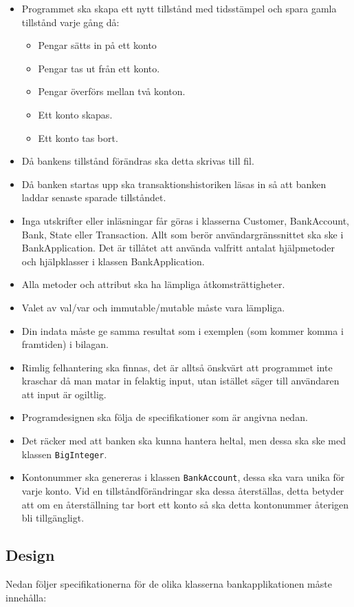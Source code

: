 \begin{itemize}
\item Programmet ska skapa ett nytt tillstånd med tidsstämpel och spara gamla tillstånd varje gång då:
\begin{itemize}
\item Pengar sätts in på ett konto
\item Pengar tas ut från ett konto.
\item Pengar överförs mellan två konton.
\item Ett konto skapas.
\item Ett konto tas bort.
\end{itemize}
\item Då bankens tillstånd förändras ska detta skrivas till fil.
\item Då banken startas upp ska transaktionshistoriken läsas in så att banken laddar senaste sparade tillståndet.
\item Inga utskrifter eller inläsningar får göras i klasserna Customer, BankAccount, Bank, State eller Transaction. Allt som berör användargränssnittet ska ske i BankApplication. Det är tillåtet att använda valfritt antalat hjälpmetoder och hjälpklasser i klassen BankApplication.
\item Alla metoder och attribut ska ha lämpliga åtkomsträttigheter.
\item Valet av val/var och immutable/mutable måste vara lämpliga.
\item Din indata måste ge samma resultat som i exemplen (som kommer komma i framtiden) i bilagan.
\item Rimlig felhantering ska finnas, det är alltså önskvärt att programmet inte kraschar då man matar in felaktig input, utan istället säger till användaren att input är ogiltlig.
\item Programdesignen ska följa de specifikationer som är angivna nedan.
\item Det räcker med att banken ska kunna hantera heltal, men dessa ska ske med klassen \texttt{BigInteger}.
\item Kontonummer ska genereras i klassen \texttt{BankAccount}, dessa ska vara unika för varje konto. Vid en tillståndförändringar ska dessa återställas, detta betyder att om en återställning tar bort ett konto så ska detta kontonummer återigen bli tillgängligt.
\end{itemize}

\subsection{Design}
Nedan följer specifikationerna för de olika klasserna bankapplikationen måste innehålla:

